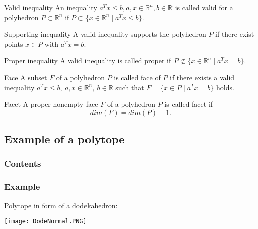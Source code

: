 \documentclass[xcolor=dvipsnames]{beamer}
\numberwithin{bsp}{section}
\numberwithin{figure}{section}
\begin{document}
\begin{frame}
	\begin{block}{Valid inequality}
		An inequality $a^{T}x \leq b, a, x \in \mathbb{R}^{n}, b \in \mathbb{R}$ is called valid for a polyhedron $P \subset \mathbb{R}^{n}$ if $P \subset \{ x \in \mathbb{R}^{n}\mid a^{T}x \leq b\}$.
	\end{block}

\begin{block}{Supporting inequality}
	A valid inequality supports the polyhedron $P$ if there exist points $x \in P$ with $a^{T}x = b$.
\end{block}
	
\begin{block}{Proper inequality}
	A valid inequality is called proper if $P \not \subset \{ x \in \mathbb{R}^{n}\mid a^{T}x = b\}$.
\end{block}
\end{frame}

\begin{frame}
	\begin{block}{Face}
		A subset $F$ of a polyhedron $P$ is called face of $P$ if there exists a valid inequality $a^{T}x \leq b,\ a, x \in \mathbb{R}^{n},\ b \in \mathbb{R}$ such that $F= \{x\in P\mid a^{T}x = b\}$ holds.
	\end{block}
	
	\begin{block}{Facet}
		A proper nonempty face $F$ of a polyhedron $P$ is called facet if 
		\begin{equation*}
		dim(F) = dim(P)-1.
		\end{equation*}
	\end{block}
\end{frame}


\subsection{Example of a polytope}

\begin{frame}[plain]
	\frametitle{Contents}
	\linespread{1.1}
	\tableofcontents[currentsubsection]
\end{frame}

\begin{frame}
	\frametitle{Example}
	Polytope in form of a dodekahedron:
	\begin{center}
		\texttt{[image: DodeNormal.PNG]}
	\end{center} 
\end{frame}
\end{document}
